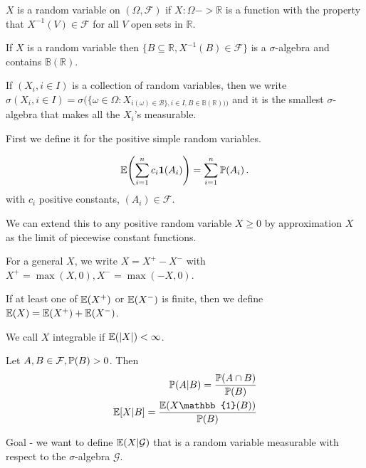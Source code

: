 \begin{defn}
  \label{defn:5}
  $X$ is a random variable on $(\Omega, \mathcal{F})$  if $X: \Omega
  -> \mathbb{R}$ is a function with the property that $X^{-1}(V) \in
  \mathcal{F}$ for all $V$ open sets in $\mathbb{R}$.
\end{defn}

\begin{exer}
  If $X$ is a random variable then $\{ B \subseteq \mathbb{R}, X^{-1}(B)
  \in \mathcal{F} \}$ is a $\sigma$-algebra and contains
  $\mathbb{B}(\mathbb{R})$.
\end{exer}

If $(X_{i}, i \in I)$ is a collection of random variables, then we
write $\sigma(X_{i}, i \in I) = \sigma(\{ \omega \in \Omega:
X_{i(\omega) \in \mathcal{B} \}, i \in I, B \in
  \mathbb{B}(\mathbb{R}))) }$
and it is the smallest $\sigma$-algebra that makes all the $X_{i}$'s
measurable.

\begin{defn}
  \label{defn:6}
  First we define it for the positive simple random variables.

  \begin{equation}
    \label{eq:2}
    \E{\sum_{i=1}^{n} c_{i} \mathbf{1}(A_{i})} =
    \sum_{i=1}^{n} \Prob{A_{i}}.
  \end{equation}
  with $c_{i}$ positive constants, $(A_{i}) \in \mathcal{F}$.

  We can extend this to any positive random variable $X \geq 0$ by
  approximation $X$ as the limit of piecewise constant functions.

  For a general $X$, we write $X = X^{+} - X^{-}$ with $X^{+}= \max(X,
  0), X^{-} = \max(-X, 0)$.
\end{defn}

If at least one of $\E{X^{+}}$ or $\E{X^{-}}$ is
finite, then we define $\E{X} = \E{X^{+}} +
\E{X^{-}}$.

We call $X$ integrable if $\E{|X|} < \infty$.

\begin{defn}
  \label{defn:7}
  Let $A, B \in \mathcal{F}, \Prob{B} > 0$. Then
  \begin{align*}
    \Prob{A | B} = \frac{\Prob{A \cap B}}{\Prob{B}} \\
    \mathbb{E}[X | B] = \frac{\E{X \mathbb{1}(B)}}{\Prob{B}}
  \end{align*}
\end{defn}

Goal - we want to define $\E{X | \mathcal{G}}$ that is a
random variable measurable with respect to the $\sigma$-algebra
$\mathcal{G}$.

